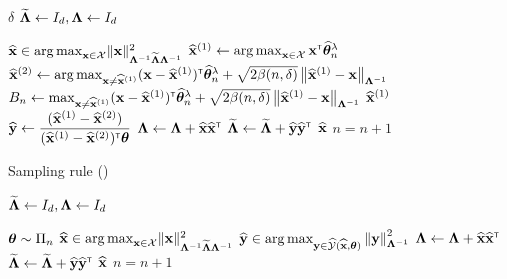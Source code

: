 \begin{algorithm}[ht]
\centering
\caption{\SLGapE}
\label{alg:slgape}
\begin{algorithmic}[1]
     $\delta$
     $\mathbf{\widetilde{\Lambda}} \leftarrow{} I_d, \mathbf{\Lambda}\leftarrow{} I_d$

        \State $\mathbf{\widehat{{\bf x}}}\in\operatorname*{arg\,max}_{{\bf x}\in\mathcal{X}}  \lVert{\bf x}\rVert_{\mathbf{\Lambda}^{-1} \mathbf{\widetilde{\Lambda}} \mathbf{\Lambda}^{-1} }^2$
        \State $\widehat{{\bf x}}^{(1)} \leftarrow \operatorname*{arg\,max}_{{\bf x}\in\mathcal{X}} {\bf x}^\mathsf{\scriptscriptstyle T}\widehat{{\boldsymbol \theta}}^{\lambda}_n$
        \State $\widehat{{\bf x}}^{(2)} \leftarrow \operatorname*{arg\,max}_{{\bf x}\neq\widehat{{\bf x}}^{(1)}} ({\bf x}-\widehat{{\bf x}}^{(1)})^\mathsf{\scriptscriptstyle T}\widehat{{\boldsymbol \theta}}^{\lambda}_n + \sqrt{2\beta(n,\delta)}\left\lVert\widehat{{\bf x}}^{(1)}-{\bf x}\right\rVert_{{\boldsymbol \Lambda}^{-1}}$
        \State $B_n \leftarrow \max_{{\bf x}\neq\widehat{{\bf x}}^{(1)}} ({\bf x}-\widehat{{\bf x}}^{(1)})^\mathsf{\scriptscriptstyle T}\widehat{{\boldsymbol \theta}}^{\lambda}_n + \sqrt{2\beta(n,\delta)}\left\lVert\widehat{{\bf x}}^{(1)}-{\bf x}\right\rVert_{{\boldsymbol \Lambda}^{-1}}$
            \State \Return $\widehat{{\bf x}}^{(1)}$
        \EndIf
        \State $\widehat{{\bf y}} \leftarrow{} \dfrac{(\widehat{{\bf x}}^{(1)}- \widehat{{\bf x}}^{(2)})}{(\widehat{{\bf x}}^{(1)}-\widehat{{\bf x}}^{(2)})^\mathsf{\scriptscriptstyle T}{\boldsymbol \theta}}$
        \State ${\boldsymbol \Lambda}\leftarrow{} \mathbf{\Lambda}+ \mathbf{\widehat{{\bf x}}}\mathbf{\widehat{{\bf x}}}^\mathsf{\scriptscriptstyle T}$
		\State $\mathbf{\widetilde{\Lambda}} \leftarrow{} \mathbf{\widetilde{\Lambda}} + \mathbf{\widehat{{\bf y}}}\mathbf{\widehat{{\bf y}}}^\mathsf{\scriptscriptstyle T}$
		\State {} $\widehat{{\bf x}}$
	    \State {}
	    \State $n = n+1$
   \EndFor
\end{algorithmic}
\end{algorithm}

\begin{algorithm}[ht]
\centering
\caption{Sampling rule (\SLTCC)}
\label{alg:slt3c}
\begin{algorithmic}[1]
    $\mathbf{\widetilde{\Lambda}} \leftarrow{} I_d, \mathbf{\Lambda}\leftarrow{} I_d$

        \State {} ${\boldsymbol \theta} \sim \Pi_n$
        \State $\mathbf{\widehat{{\bf x}}}\in\operatorname*{arg\,max}_{{\bf x}\in\mathcal{X}}  \lVert{\bf x}\rVert_{\mathbf{\Lambda}^{-1} \mathbf{\widetilde{\Lambda}} \mathbf{\Lambda}^{-1} }^2$
        \State $\mathbf{\widehat{{\bf y}}}\in\operatorname*{arg\,max}_{{\bf y}\in\widehat{\mathcal{Y}}(\widehat{{\bf x}},{\boldsymbol \theta})}\left\lVert{\bf y}\right\rVert^2_{\mathbf{\Lambda}^{-1}}$
        \State $\mathbf{\Lambda}\leftarrow{} \mathbf{\Lambda}+ \mathbf{\widehat{{\bf x}}}\mathbf{\widehat{{\bf x}}}^\mathsf{\scriptscriptstyle T}$
		\State $\mathbf{\widetilde{\Lambda}} \leftarrow{} \mathbf{\widetilde{\Lambda}} + \mathbf{\widehat{{\bf y}}}\mathbf{\widehat{{\bf y}}}^\mathsf{\scriptscriptstyle T}$
		\State {} $\widehat{{\bf x}}$
	    \State {}
	    \State $n = n+1$
   \EndFor
\end{algorithmic}
\end{algorithm}

